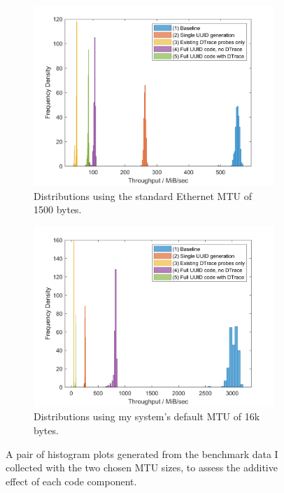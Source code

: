 \documentclass[a4paper,12pt,twoside,openright]{report}
\begin{document}
	\begin{figure}[b]
		\begin{subfigure}{\linewidth}
			\centering
			\includegraphics[width=0.9\linewidth]{include/ipc-mtu1500.png}
			\caption{Distributions using the standard Ethernet MTU of 1500 bytes.}
			\label{fig:ipc-eval-1500}
		\end{subfigure}
		\begin{subfigure}{\linewidth}
			\centering
			\includegraphics[width=0.9\linewidth]{include/ipc-mtu16k.png}
			\caption{Distributions using my system's default MTU of 16k bytes.}
			\label{fig:ipc-eval-16k}
		\end{subfigure}
		\caption{A pair of histogram plots generated from the benchmark data I collected with the two chosen MTU sizes, to assess the additive effect of each code component.}
		\label{fig:ipc-eval}
	\end{figure}
\end{document}
